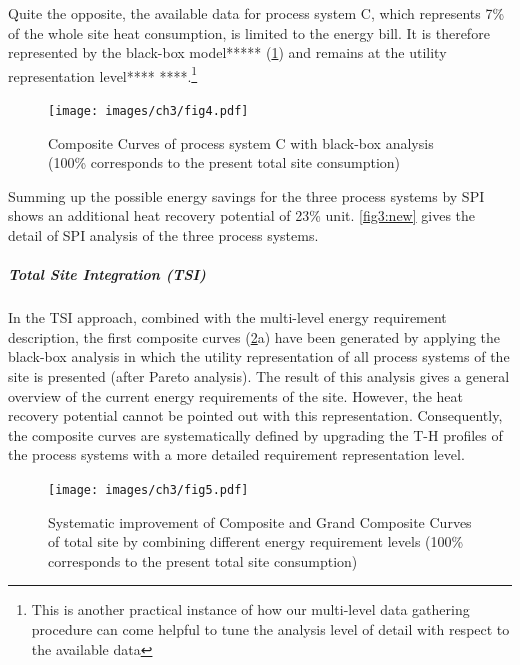 Quite the opposite, the available data for process system C, which represents 7\% of the whole site heat consumption, is limited to the energy bill. It is therefore represented by the  black-box model***** (\cref{fig3:V}) and remains at the utility representation level**** ****.\footnote{This is another practical instance of how our multi-level data gathering procedure can come helpful to tune the analysis level of detail with respect to the available data} 
 
\vspace{10pt}
\begin{figure}[!ht]
\begin{center}
\texttt{[image: images/ch3/fig4.pdf]}
\caption{Composite Curves of process system C with black-box analysis (100\% corresponds to the present total site consumption)}
\label{fig3:V}
\end{center}
\end{figure}

 Summing up the possible energy savings for the three process systems by SPI shows an additional heat recovery potential of 23\% unit. \cref{fig3:new} gives the detail of SPI analysis of the three process systems.
 
\subparagraph{Total Site Integration (TSI)}

In the TSI approach, combined with the multi-level energy requirement description, the first composite curves (\cref{fig3:VI}a) have been generated by applying the black-box analysis in which the utility representation of all process systems of the site is presented (after Pareto analysis). The result of this analysis gives a general overview of the current energy requirements of the site. However, the heat recovery potential cannot be pointed out with this representation. Consequently, the composite curves are systematically defined by upgrading the T-H profiles of the process systems with a more detailed requirement representation level.
 
 \begin{figure}[!ht]
\vspace{5mm}
\begin{center}
\texttt{[image: images/ch3/fig5.pdf]}
\caption{Systematic improvement of Composite and Grand Composite Curves of total site by combining different energy requirement levels (100\% corresponds to the present total site consumption)}
\label{fig3:VI}
\end{center}
\end{figure}


